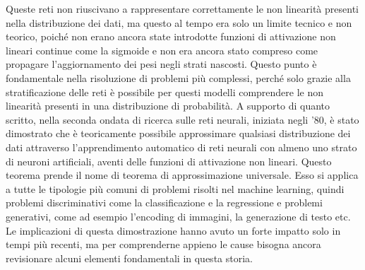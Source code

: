 Queste reti non riuscivano a rappresentare correttamente le non linearità presenti nella distribuzione dei dati, ma questo al tempo era solo un limite tecnico e non teorico, poiché non erano ancora state introdotte funzioni di attivazione non lineari continue come la sigmoide e non era ancora stato compreso come propagare l'aggiornamento dei pesi negli strati nascosti. Questo punto è fondamentale nella risoluzione di problemi più complessi, perché solo grazie alla stratificazione delle reti è possibile per questi modelli comprendere le non linearità presenti in una distribuzione di probabilità. A supporto di quanto scritto, nella seconda ondata di ricerca sulle reti neurali, iniziata negli '80, è stato dimostrato che è teoricamente possibile approssimare qualsiasi distribuzione dei dati attraverso l'apprendimento automatico di reti neurali con almeno uno strato di neuroni artificiali, aventi delle funzioni di attivazione non lineari. Questo teorema prende il nome di teorema di approssimazione universale. Esso si applica a tutte le tipologie più comuni di problemi risolti nel machine learning, quindi problemi discriminativi come la classificazione e la regressione e problemi generativi, come ad esempio l'encoding di immagini, la generazione di testo etc. Le implicazioni di questa dimostrazione hanno avuto un forte impatto solo in tempi più recenti, ma per comprenderne appieno le cause bisogna ancora revisionare alcuni elementi fondamentali in questa storia.


